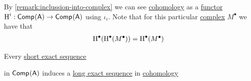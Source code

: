 \documentclass[../../../main]{subfiles}
\begin{document}
\begin{remark}
  By \autoref{remark:inclussion-into-complex} we can see \hyperref[def:cohomology]{cohomology} as a \hyperref[def:functor]{functor} \(\operatorname{H}^{i}: \mathsf{Comp}^{}(\mathsf{A}) \to \mathsf{Comp}^{}(\mathsf{A})\) using \(\iota_{i}\).
  Note that for this particular \hyperref[def:complex]{complex} \(M^{\bullet}\) we have that
  \begin{align*}
    \operatorname{H}^{\bullet}(\operatorname{H}^{\bullet}(M^{\bullet})) = \operatorname{H}^{\bullet}(M^{\bullet})
  \end{align*}
\end{remark}


\begin{theorem} \label{thm:LES-in-cohomology}
  Every \hyperref[def:short-exact-sequence]{short exact sequence}
  \begin{center}
  \end{center}
  in \(\mathsf{Comp}^{}(\mathsf{A})\) induces a \hyperref[def:exact-complex]{long exact sequence} in \hyperref[def:cohomology]{cohomology}
  \begin{center}
  \end{center}
\end{theorem}
\end{document}
